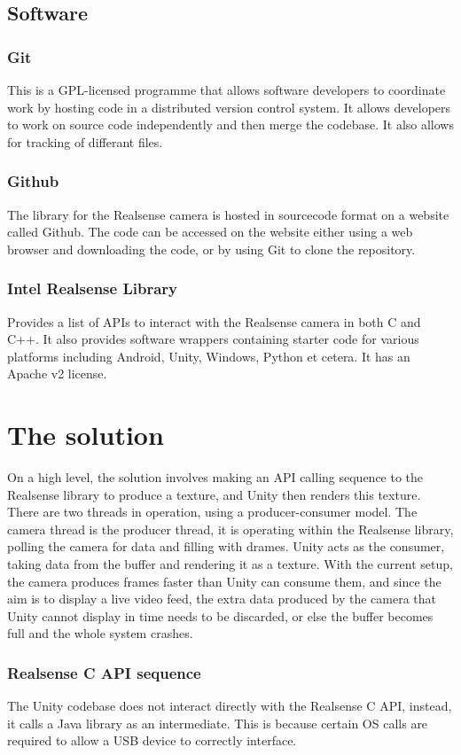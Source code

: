     \subsection{Software}
        \subsubsection{Git}
        This is a GPL-licensed programme that allows software developers to coordinate work by hosting code in a distributed version control system. It allows developers to work on source code independently and then merge the codebase. It also allows for tracking of differant files.
        \subsubsection{Github}
        The library for the Realsense camera is hosted in sourcecode format on a website called Github. The code can be accessed on the website either using a web browser and downloading the code, or by using Git to clone the repository.
        \subsubsection{Intel Realsense Library}
        Provides a list of APIs to interact with the Realsense camera in both C and C++. It also provides software wrappers containing starter code for various platforms including Android, Unity, Windows, Python et cetera. It has an Apache v2 license.
        

\section{The solution}
    On a high level, the solution involves making an API calling sequence to the Realsense library to produce a texture, and Unity then renders this texture. There are two threads in operation, using a producer-consumer model. The camera thread is the producer thread, it is operating within the Realsense library, polling the camera for data and filling with drames. Unity acts as the consumer, taking data from the buffer and rendering it as a texture. With the current setup, the camera produces frames faster than Unity can consume them, and since the aim is to display a live video feed, the extra data produced by the camera that Unity cannot display in time needs to be discarded, or else the buffer becomes full and the whole system crashes.

    \subsubsection{Realsense C API sequence}
    The Unity codebase does not interact directly with the Realsense C API, instead, it calls a Java library as an intermediate. This is because certain OS calls are required to allow a USB device to correctly interface.

